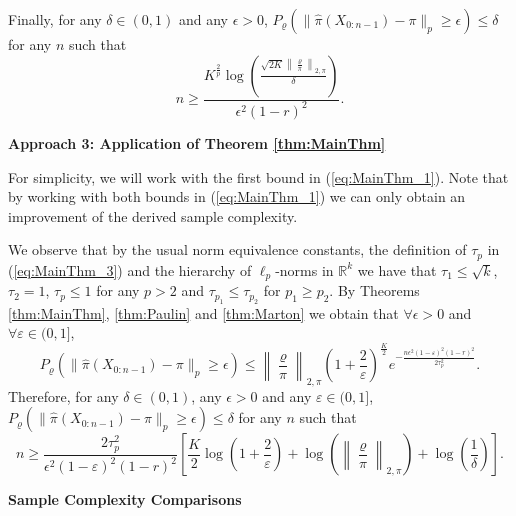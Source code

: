 \documentclass[twoside,11pt]{article}
\begin{document}
Finally, for any $\delta\in (0,1)$ and any $\epsilon>0$, $P_{\varrho}(\|\hat{\pi}(X_{0:n-1})-\pi\|_{p}\geq \epsilon)\leq \delta$ for any $n$ such that 
\begin{equation}\label{eq:sample_complexity_Markov_2}
n\geq \frac{K^{\frac{2}{p}} \log\left(\frac{\sqrt{2K}\left\|\frac{\varrho}{\pi}\right\|_{2,\pi}}{\delta}\right)}{\epsilon^2(1-r)^2}.
\end{equation}
\vspace{0.01cm}


\noindent\textbf{Approach 3: Application of Theorem \ref{thm:MainThm}}

 For simplicity, we will work with the first bound in (\ref{eq:MainThm_1}). Note that  by working with both bounds in (\ref{eq:MainThm_1}) we can only obtain an improvement of the derived sample complexity. 
 
 We observe that by the usual norm equivalence constants, the definition of $\tau_p$ in (\ref{eq:MainThm_3}) and the hierarchy of $\ell_p$-norms in $\mathbb{R}^k$ we have that $\tau_1\leq \sqrt{k}$, $\tau_2=1$, $\tau_p\leq 1$ for any $p>2$ and $\tau_{p_1}\leq \tau_{p_2}$ for $p_1\geq p_2$. By Theorems \ref{thm:MainThm}, \ref{thm:Paulin} and \ref{thm:Marton}  we obtain that $ \forall \epsilon>0$ and $\forall \varepsilon \in (0,1]$,
\begin{equation}\label{eq:Bobkov_Gotze_Extension_Markov_probability_bound}
P_{\varrho}(\|\hat{\pi}(X_{0:n-1})-\pi\|_{p}\geq \epsilon)\leq \left\|\frac{\varrho}{\pi}\right\|_{2,\pi} \left(1+\frac{2}{\varepsilon}\right)^{\frac{K}{2}}e^{-\frac{n\epsilon^2(1-\varepsilon)^2(1-r)^2}{2 \tau_p^2}}.
\end{equation}
Therefore, for any $\delta\in (0,1)$, any $\epsilon>0$ and any $\varepsilon\in (0,1]$, $P_{\varrho}(\|\hat{\pi}(X_{0:n-1})-\pi\|_{p}\geq \epsilon)\leq \delta$ for any $n$ such that 
\begin{equation}\label{eq:sample_complexity_Markov_3}
n\geq \frac{2\tau_p^2}{\epsilon^2(1-\varepsilon)^2(1-r)^2}\left[\frac{K}{2}\log\left(1+\frac{2}{\varepsilon}\right)+\log\left(\left\|\frac{\varrho}{\pi}\right\|_{2,\pi}\right)+\log\left(\frac{1}{\delta}\right)\right].
\end{equation}

\noindent\textbf{Sample Complexity Comparisons}
\end{document}
